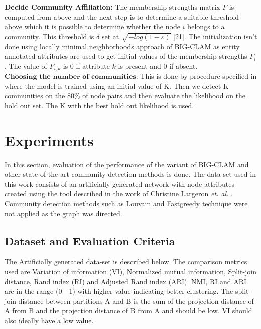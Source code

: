 \textbf{Decide Community Affiliation:} The membership strengths
matrix $F$ is computed from above and the next step is to
determine a suitable threshold above which it is possible to
determine whether the node $i$ belongs to a community. This
threshold is $\delta$ set at $\sqrt{−log(1 - \varepsilon)}$ [21]. The initialization
isn't done using locally minimal neighborhoods approach of
BIG-CLAM \cite{aps:53} as entity annotated attributes are used to get
initial values of the membership strengths $F_i$. The value of
$F_{i,k}$ is 0 if attribute $k$ is present and 0 if absent.\\

$\textbf{Choosing the number of communities:}$ This is done by
procedure specified in \cite{aps:53} where the model is trained using
an initial value of K. Then we detect K communities on the
80\% of node pairs and then evaluate the likelihood on the hold
out set. The K with the best hold out likelihood is used.\\

\section{Experiments}
In this section, evaluation of the performance of the variant of BIG-CLAM and other state-of-the-art community detection methods is done. The data-set used in this work consists of an artificially generated network with node attributes created using the tool described in the work of  Christine Largeron \textit{et. al.} \cite{aps:55}. Community detection methods such as Louvain and Fastgreedy technique were not applied as the graph was directed.

\subsection{Dataset and Evaluation Criteria}
The Artificially generated data-set is described below. The comparison metrics used are Variation of information (VI), Normalized mutual information, Split-join distance, Rand index (RI) and Adjusted Rand index (ARI). NMI, RI and ARI are in the range (0 - 1) with higher value indicating better clustering. The split-join distance between partitions A and B is the sum of the projection distance of A from B and the projection distance of B from A and should be low. VI should also ideally have a low value.

